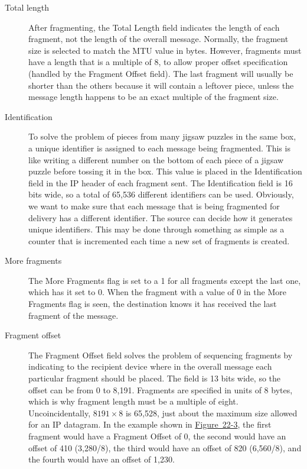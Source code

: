 \begin{description}
   \item[Total length]
      After fragmenting, the Total Length field indicates the length of each fragment, not the length of the overall message.
      Normally, the fragment size is selected to match the MTU value in bytes.
      However, fragments must have a length that is a multiple of 8, to allow proper offset specification (handled by the Fragment Offset field).
      The last fragment will usually be shorter than the others because it will contain a leftover piece, unless the message length happens to be an exact multiple of the fragment size.

   \item[Identification]
      To solve the problem of pieces from many
jigsaw puzzles in the same box, a unique identifier is assigned to each
message being fragmented. This is like writing a different number on the
bottom of each piece of a jigsaw puzzle before tossing it in the box.
This value is placed in the Identification field in the IP header of
each fragment sent. The Identification field is 16 bits wide, so a total
of 65,536 different identifiers can be used. Obviously, we want to make
sure that each message that is being fragmented for delivery has a
different identifier. The source can decide how it generates unique
identifiers. This may be done through something as simple as a counter
that is incremented each time a new set of fragments is created.

   \item[More fragments]
      The More Fragments flag is set to a 1 for all fragments except the last one, which has it set to 0. When the fragment with a
value of 0 in the More Fragments flag is seen, the destination knows it
has received the last fragment of the message.

   \item[Fragment offset]
      The Fragment Offset field solves the problem
of sequencing fragments by indicating to the recipient device where in
the overall message each particular fragment should be placed. The field
is 13 bits wide, so the offset can be from 0 to 8,191. Fragments are
specified in units of 8 bytes, which is why fragment length must be a multiple of eight.
Uncoincidentally, $8191\times 8$ is 65,528, just about the maximum size allowed for an IP datagram.
In the example shown in \protect\hyperlink{ch22s02.htmlux5cux23ipv4_datagram_fragmentation_process_in_t}{Figure~22-3},
the first fragment would have a Fragment Offset of 0, the second would have an offset of 410 (3,280/8), the third would have an offset of 820
(6,560/8), and the fourth would have an offset of 1,230.
\end{description}


